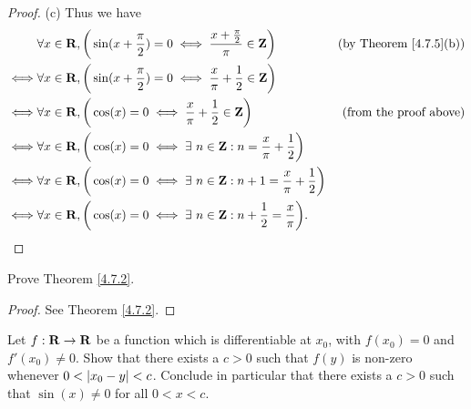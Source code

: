 \begin{proof}{(c)}
    Thus we have
    \begin{align*}
             & \forall x \in \mathbf{R}, \bigg(\sin(x + \frac{\pi}{2}) = 0 \iff \frac{x + \frac{\pi}{2}}{\pi} \in \mathbf{Z}\bigg)    & \text{(by Theorem \ref{4.7.5}(b))} \\
        \iff & \forall x \in \mathbf{R}, \bigg(\sin(x + \frac{\pi}{2}) = 0 \iff \frac{x}{\pi} + \frac{1}{2} \in \mathbf{Z}\bigg)                                           \\
        \iff & \forall x \in \mathbf{R}, \bigg(\cos(x) = 0 \iff \frac{x}{\pi} + \frac{1}{2} \in \mathbf{Z}\bigg)                      & \text{(from the proof above)}      \\
        \iff & \forall x \in \mathbf{R}, \bigg(\cos(x) = 0 \iff \exists\ n \in \mathbf{Z} : n = \frac{x}{\pi} + \frac{1}{2}\bigg)                                          \\
        \iff & \forall x \in \mathbf{R}, \bigg(\cos(x) = 0 \iff \exists\ n \in \mathbf{Z} : n + 1 = \frac{x}{\pi} + \frac{1}{2}\bigg)                                      \\
        \iff & \forall x \in \mathbf{R}, \bigg(\cos(x) = 0 \iff \exists\ n \in \mathbf{Z} : n + \frac{1}{2} = \frac{x}{\pi}\bigg).
    \end{align*}
\end{proof}

\exercisesection

\begin{exercise}\label{ex 4.7.1}
    Prove Theorem \ref{4.7.2}.
\end{exercise}

\begin{proof}
    See Theorem \ref{4.7.2}.
\end{proof}

\begin{exercise}\label{ex 4.7.2}
    Let \(f : \mathbf{R} \to \mathbf{R}\) be a function which is differentiable at \(x_0\), with \(f(x_0) = 0\) and \(f'(x_0) \neq 0\).
    Show that there exists a \(c > 0\) such that \(f(y)\) is non-zero whenever \(0 < \left\lvert x_0 - y\right\rvert < c\).
    Conclude in particular that there exists a \(c > 0\) such that \(\sin(x) \neq 0\) for all \(0 < x < c\).
\end{exercise}

